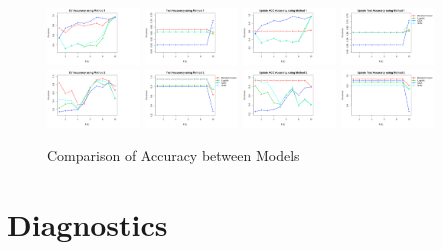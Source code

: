 \documentclass[11pt]{article}
\begin{document}
\begin{figure}[h]
\includegraphics[width=0.22\textwidth]{raw_cv_1.png}
\includegraphics[width=0.22\textwidth]{raw_test_1.png}
\includegraphics[width=0.22\textwidth]{update_cv_1.png}
\includegraphics[width=0.22\textwidth]{update_test_1.png}
\includegraphics[width=0.22\textwidth]{raw_cv_2.png}
\includegraphics[width=0.22\textwidth]{raw_test_2.png}
\includegraphics[width=0.22\textwidth]{update_cv_2.png}
\includegraphics[width=0.22\textwidth]{update_test_2.png}
\centering
\caption{Comparison of Accuracy between Models}
\label{fig:4-1-1}
\centering
\end{figure}


\section{Diagnostics}
\end{document}
